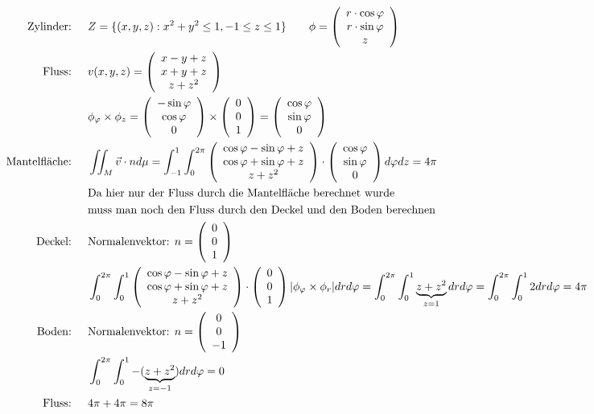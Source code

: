 \documentclass[a4paper]{article}
\begin{document}
		\begin{fmerke}
			\begin{align*}
			\text{Zylinder: }\quad &Z= \{(x,y,z): x^2+y^2 \leq 1, -1 \leq z \leq 1 \} \qquad \phi = \left( \begin{array}{c} r \cdot \cos \varphi \\ r \cdot \sin \varphi \\ z \end{array} \right)\\
			\text{Fluss: }\quad &v(x,y,z) = \left( \begin{array}{c} x-y+z\\ x+y+z \\ z+z^2 \end{array} \right)\\
			& \phi_\varphi \times \phi_z = \left( \begin{array}{c} -\sin\varphi \\ \cos \varphi \\ 0  \end{array} \right) \times \left( \begin{array}{c} 0 \\ 0 \\ 1 \end{array} \right) = \left( \begin{array}{c} \cos \varphi \\ \sin \varphi \\ 0 \end{array} \right)\\
			\text{Mantelfläche: }\quad &
			\iint_M \vec v \cdot n d \mu = \int_{-1}^1 \int_0^{2\pi} \left( \begin{array}{c} \cos \varphi - \sin \varphi + z \\ \cos \varphi + \sin \varphi +z \\ z+z^2 \end{array} \right)\cdot \left( \begin{array}{c} \cos \varphi \\ \sin \varphi \\ 0 \end{array} \right) d \varphi d z = 4 \pi\\
			&\text{Da hier nur der Fluss durch die Mantelfläche berechnet wurde}\\
			&\text{muss man noch den Fluss durch den Deckel und den Boden berechnen}\\
			\text{Deckel: }\quad&\text{Normalenvektor: }n = \left( \begin{array}{c} 0 \\ 0 \\ 1 \end{array} \right)\\
			&\int_0^{2\pi} \int_0^1  \left( \begin{array}{c} \cos \varphi - \sin \varphi + z \\ \cos \varphi + \sin \varphi +z \\ z+z^2 \end{array} \right) \cdot \left( \begin{array}{c} 0\\0 \\ 1 \end{array} \right) |\phi_\varphi \times \phi_r|drd\varphi = \int_0^{2\pi} \int_0^1 \underbrace{z+z^2}_{z=1} drd\varphi =  \int_0^{2\pi} \int_0^1 2 drd\varphi = 4 \pi\\
			\text{Boden: }\quad&\text{Normalenvektor: }n = \left( \begin{array}{c} 0 \\ 0 \\ -1 \end{array} \right)\\
			&\int_0^{2\pi} \int_0^1 -(\underbrace{z+z^2}_{z=-1}) drd\varphi =  0\\
			\text{Fluss: }\quad&4\pi + 4\pi = 8\pi
			\end{align*}

		\end{fmerke}
\end{document}
